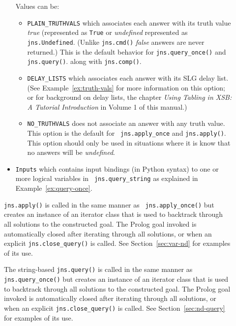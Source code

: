 \begin{description}
\begin{itemize}
        Values can be:
        \begin{itemize}
        \item {\tt PLAIN\_TRUTHVALS} which associates each answer with
          its truth value {\em true} (represented as {\tt True} or
          {\em undefined} represented as {\tt
            jns.Undefined}. (Unlike {\tt jns.cmd()}
        {\em false} answers are never returned.)  This is the default
        behavior for {\tt jns.query\_once()} and {\tt
          jns.query()}. along with {\tt jns.comp()}.
      \item {\tt DELAY\_LISTS} which associates each answer with its
        SLG delay list. (See Example~\ref{ex:truth-vals} for more
        information on this option; or for background on delay lists,
        the chapter {\em Using Tabling in XSB: A Tutorial
          Introduction} in Volume 1 of this manual.)

      \item {\tt NO\_TRUTHVALS} does not associate an answer with any
        truth value.  This option is the default for {\tt
          jns.apply\_once} and {\tt jns.apply()}.  This option should
        only be used in situations where it is know that no answers
        will be {\em undefined}.
        \end{itemize}
      \item {\tt Inputs} which contains input bindings (in Python
        syntax) to one or more logical variables in {\tt
          jns.query\_string} as explained in Example~\ref{ex:query-once}.
      \end{itemize}

%
{\tt jns.apply()} is called in the same manner as {\tt
  jns.apply\_once()} but creates an instance of an iterator class that
is used to backtrack through all solutions to the constructed goal.
The Prolog goal invoked is automatically closed after iterating
through all solutions, or when an explicit {\tt jns.close\_query()} is
called.  See Section~\ref{sec:var-nd} for examples of its use.

%
The string-based {\tt jns.query()} is called in the same manner as
{\tt jns.query\_once()} but creates an instance of an iterator class
that is used to backtrack through all solutions to the constructed
goal.  The Prolog goal invoked is automatically closed after iterating
through all solutions, or when an explicit {\tt jns.close\_query()} is
called.  See Section~\ref{sec:nd-query} for examples of its use.


\end{description}
